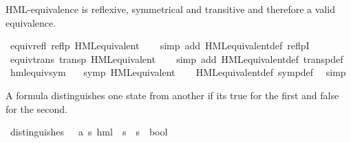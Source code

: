 \begin{isabellebody}
%
\isadelimproof
%
\endisadelimproof
%
\isatagproof
%
\endisatagproof
{\isafoldproof}%
%
\isadelimproof
%
\endisadelimproof
%
\begin{isamarkuptext}%
HML-equivalence is reflexive, symmetrical and transitive and therefore a valid equivalence.%
\end{isamarkuptext}\isamarkuptrue%
\isamarkupfalse%
\ equiv{\isacharunderscore}{\kern0pt}refl{\isacharcolon}{\kern0pt}\ {\isachardoublequoteopen}reflp\ HML{\isacharunderscore}{\kern0pt}equivalent{\isachardoublequoteclose}\isanewline
%
\isadelimproof
\ \ %
\endisadelimproof
%
\isatagproof
{}\isamarkupfalse%
\ {\isacharparenleft}{\kern0pt}simp\ add{\isacharcolon}{\kern0pt}\ HML{\isacharunderscore}{\kern0pt}equivalent{\isacharunderscore}{\kern0pt}def\ reflpI{\isacharparenright}{\kern0pt}%
\endisatagproof
{\isafoldproof}%
%
\isadelimproof
\isanewline
%
\endisadelimproof
\isanewline
{}\isamarkupfalse%
\ equiv{\isacharunderscore}{\kern0pt}trans{\isacharcolon}{\kern0pt}\ {\isachardoublequoteopen}transp\ HML{\isacharunderscore}{\kern0pt}equivalent{\isachardoublequoteclose}\isanewline
%
\isadelimproof
\ \ %
\endisadelimproof
%
\isatagproof
{}\isamarkupfalse%
\ {\isacharparenleft}{\kern0pt}simp\ add{\isacharcolon}{\kern0pt}\ HML{\isacharunderscore}{\kern0pt}equivalent{\isacharunderscore}{\kern0pt}def\ transp{\isacharunderscore}{\kern0pt}def{\isacharparenright}{\kern0pt}%
\endisatagproof
{\isafoldproof}%
%
\isadelimproof
\isanewline
%
\endisadelimproof
\isanewline
{}\isamarkupfalse%
\ hml{\isacharunderscore}{\kern0pt}equiv{\isacharunderscore}{\kern0pt}sym{\isacharcolon}{\kern0pt}\isanewline
\ \ \ {\isacartoucheopen}symp\ HML{\isacharunderscore}{\kern0pt}equivalent{\isacartoucheclose}\isanewline
%
\isadelimproof
\ \ %
\endisadelimproof
%
\isatagproof
{}\isamarkupfalse%
\ HML{\isacharunderscore}{\kern0pt}equivalent{\isacharunderscore}{\kern0pt}def\ symp{\isacharunderscore}{\kern0pt}def\ \isamarkupfalse%
\ simp%
\endisatagproof
{\isafoldproof}%
%
\isadelimproof
%
\endisadelimproof
%
\begin{isamarkuptext}%
A formula distinguishes one state from another if its true for the first and false for the second.%
\end{isamarkuptext}\isamarkuptrue%
\isamarkupfalse%
\ distinguishes\ {\isacharcolon}{\kern0pt}{\isacharcolon}{\kern0pt}\ \ {\isacartoucheopen}{\isacharparenleft}{\kern0pt}{\isacharprime}{\kern0pt}a{\isacharcomma}{\kern0pt}\ {\isacharprime}{\kern0pt}s{\isacharparenright}{\kern0pt}\ hml\ {\isasymRightarrow}\ {\isacharprime}{\kern0pt}s\ {\isasymRightarrow}\ {\isacharprime}{\kern0pt}s\ {\isasymRightarrow}\ bool{\isacartoucheclose}\ \isanewline

\end{isabellebody}

